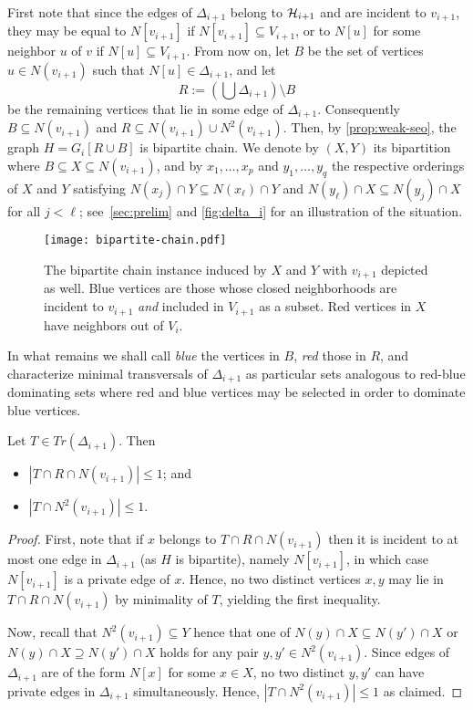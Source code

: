 First note that since the edges of $\Delta_{i+1}$ belong to $\mathcal{H}_{i+1}$ and are incident to $v_{i+1}$, they may be equal to $N[v_{i+1}]$ if $N[v_{i+1}]\subseteq V_{i+1}$, or to $N[u]$ for some neighbor $u$ of $v$ if $N[u]\subseteq V_{i+1}$.
From now on, let $B$ be the set of vertices $u\in N(v_{i+1})$ such that $N[u]\in \Delta_{i+1}$, and let
\[
    R:=\left(\bigcup\Delta_{i+1}\right) \setminus B
\]
be the remaining vertices that lie in some edge of $\Delta_{i+1}$.
Consequently $B\subseteq N(v_{i+1})$ and $R\subseteq N(v_{i+1})\cup N^2(v_{i+1})$.
Then, by \autoref{prop:weak-seo}, the graph $H=G_i[R\cup B]$ is bipartite chain.
We denote by $(X,Y)$ its bipartition where $B\subseteq X\subseteq N(v_{i+1})$, and by $x_1,\dots,x_p$ and $y_1,\dots,y_q$ the respective orderings of $X$ and $Y$ satisfying $N(x_j)\cap Y\subseteq N(x_\ell)\cap Y$ and $N(y_\ell)\cap X\subseteq N(y_j)\cap X$ for all $j<\ell$; see~\autoref{sec:prelim} and \autoref{fig:delta_i} for an illustration of the situation.

\begin{figure}
    \centering
    \texttt{[image: bipartite-chain.pdf]}
    \caption{The bipartite chain instance induced by $X$ and $Y$ with $v_{i+1}$ depicted as well. Blue vertices are those whose closed neighborhoods are incident to $v_{i+1}$ \emph{and} included in $V_{i+1}$ as a subset. Red vertices in $X$ have neighbors out of $V_i$.}
    \label{fig:delta_i}
\end{figure}

In what remains we shall call \emph{blue} the vertices in $B$, \emph{red} those in $R$, and characterize minimal transversals of $\Delta_{i+1}$ as particular sets analogous to red-blue dominating sets where red and blue vertices may be selected in order to dominate blue vertices.

\begin{proposition}\label{prop:red-part}
    Let $T\in Tr(\Delta_{i+1})$. 
    Then 
    \begin{itemize}
        \item $|T \cap R \cap N(v_{i+1})|\leq 1$; and
        \item $|T\cap N^2(v_{i+1})|\leq 1$.
    \end{itemize}
\end{proposition}

\begin{proof}
    First, note that if $x$ belongs to $T \cap R \cap N(v_{i+1})$ then it is incident to at most one edge in $\Delta_{i+1}$ (as $H$ is bipartite), namely $N[v_{i+1}]$, in which case $N[v_{i+1}]$ is a private edge of $x$.
    Hence, no two distinct vertices $x,y$ may lie in $T \cap R \cap N(v_{i+1})$ by minimality of $T$, yielding the first inequality.

    Now, recall that $N^2(v_{i+1})\subseteq Y$ hence that one of $N(y)\cap X\subseteq N(y')\cap X$ or $N(y)\cap X\supseteq N(y')\cap X$ holds for any pair $y,y'\in N^2(v_{i+1})$.
    Since edges of $\Delta_{i+1}$ are of the form $N[x]$ for some $x\in X$, no two distinct $y,y'$ can have private edges in $\Delta_{i+1}$ simultaneously.
    Hence, $|T\cap N^2(v_{i+1})|\leq 1$ as claimed.
\end{proof}

